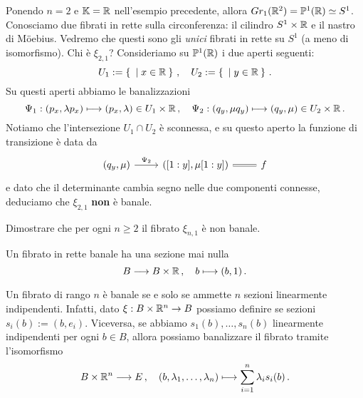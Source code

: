 \begin{ex}
\begin{rmnumerate}
		\item Ponendo $n=2$ e $\mathbb{K} = {\mathbb R}$ nell'esempio precedente,
		allora $Gr_{1}({\mathbb R}^{2}) = \mathbb{P}^{1}({\mathbb R}) \simeq S^{1}$.
		Conosciamo due fibrati in rette sulla circonferenza:
		il cilindro $S^{1} \times {\mathbb R}$ e il nastro di Möebius.
		Vedremo che questi sono gli \emph{unici} fibrati in rette su $S^{1}$
		(a meno di isomorfismo). Chi è $\xi_{2,1}$?
		Consideriamo su $\mathbb{P}^{1}({\mathbb R})$ i due aperti seguenti:
		\begin{equation*}
			U_{1} := \Set{ | x \in {\mathbb R}}\,, \quad
			U_{2} := \Set{ | y \in {\mathbb R}}\,.
		\end{equation*}
		Su questi aperti abbiamo le banalizzazioni
		\begin{equation*}
			\Psi_{1} : (p_{x}, \lambda p_{x} ) \longmapsto (p_{x}, \lambda) \in U_{1} \times {\mathbb R}\,,
			\quad \Psi_{2} : (q_{y}, \mu q_{y}) \longmapsto (q_{y},\mu) \in U_{2} \times {\mathbb R}\,.
		\end{equation*}
		Notiamo che l'intersezione $U_{1} \cap U_{2}$ è sconnessa,
		e su questo aperto la funzione di transizione è data da
		\begin{equation*}
			\begin{tikzcd}
				(q_{y},\mu) \ar[r, "\Psi_{2}"]
				& {\left({[1:y]}, \mu {[1:y]} \right)} \ar[r,equals]
				& f
			\end{tikzcd}
		\end{equation*}
		e dato che il determinante cambia segno nelle due componenti
		connesse, deduciamo che $\xi_{2,1}$ \textbf{non} è banale.
	\end{rmnumerate}
\end{ex}

\begin{exercise}
	Dimostrare che per ogni $n \ge 2$ il fibrato $\xi_{n,1}$ è non banale.
\end{exercise}

\begin{ex}
	Un fibrato in rette banale ha una sezione mai nulla
	\begin{equation*}
		B \longrightarrow B \times {\mathbb R}\,,
		\quad b \longmapsto (b,1)\,.
	\end{equation*}
\end{ex}

\begin{oss}
	Un fibrato di rango $n$ è banale se e solo se ammette
	$n$ sezioni linearmente indipendenti.
	Infatti, dato $\xi:B \times {\mathbb R}^{n} \to B$ possiamo definire
	se sezioni $s_{i}(b) := (b, e_{i})$. Viceversa,
	se abbiamo $s_{1}(b), \dots, s_{n}(b)$ linearmente indipendenti per ogni $b \in B$,
	allora possiamo banalizzare il fibrato tramite l'isomorfismo
	\begin{equation*}
		B \times {\mathbb R}^{n} \longrightarrow E\,,
		\quad (b, \lambda_{1}, \dots, \lambda_{n}) \longmapsto \sum_{i=1}^{n}\lambda_{i}s_{i}(b)\,.
	\end{equation*}
\end{oss}


